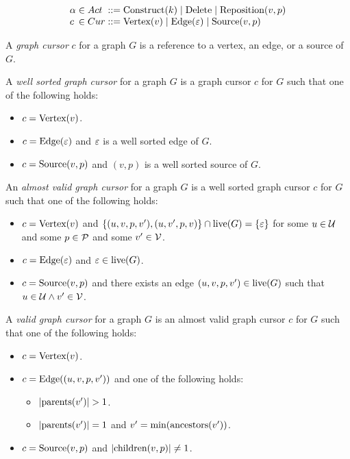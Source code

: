 \[
  \arraycolsep=0pt
  \begin{array}{lcllll}
    \alpha & {}\in{} & Act & {}::={} &
      \Construct{k}
      \mid \Delete
      \mid \Reposition{v}{p}
    \\
    c & {}\in{} & Cur & {}::={} &
      \CVertex{v}
      \mid \CEdge{\e}
      \mid \CSource{v}{p}
    \\
  \end{array}
\]

\begin{definition}
  A \emph{graph cursor} $c$ for a graph $G$ is a reference to a vertex, an edge, or a source of $G$.
\end{definition}

\begin{definition}
  A \emph{well sorted graph cursor} for a graph $G$ is a graph cursor $c$ for $G$ such that one of the following holds:
  \begin{itemize}
    \item $c = \CVertex{v}$.
    \item $c = \CEdge{\e}$ and $\e$ is a well sorted edge of $G$.
    \item $c = \CSource{v}{p}$ and $(v, p)$ is a well sorted source of $G$.
  \end{itemize}
\end{definition}

\begin{definition}
  An \emph{almost valid graph cursor} for a graph $G$ is a well sorted graph cursor $c$ for $G$ such that one of the following holds:
  \begin{itemize}
    \item $c = \CVertex{v}$
      and $\SetOf{(u, v, p, v'), (u, v', p, v)} \cap \live{G} = \SetOf{\e}$
      for some $u \in \U$ and some $p \in \P$ and some $v' \in \V$.
    \item $c = \CEdge{\e}$ and $\e \in \live{G}$.
    \item $c = \CSource{v}{p}$ and there exists an edge $(u, v, p, v') \in \live{G}$ such that $u \in \U \land v' \in \V$.
  \end{itemize}
\end{definition}

\begin{definition}
  A \emph{valid graph cursor} for a graph $G$ is an almost valid graph cursor $c$ for $G$ such that one of the following holds:
  \begin{itemize}
    \item $c = \CVertex{v}$.
    \item $c = \CEdge{(u, v, p, v')}$ and one of the following holds:
    \begin{itemize}
      \item $\SizeOf{\parents{v'}} > 1$.
      \item $\SizeOf{\parents{v'}} = 1$ and $v' = \min{\ancestors{v'}}$.
    \end{itemize}
    \item $c = \CSource{v}{p}$ and $\SizeOf{\children{v}{p}} \neq 1$.
  \end{itemize}
\end{definition}

